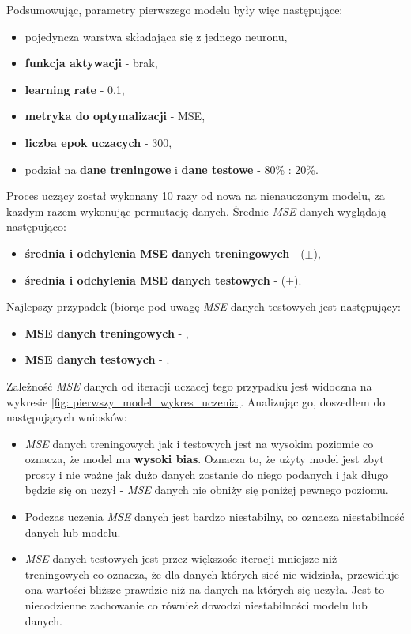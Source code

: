 \documentclass[12pt]{aghdpl}
\begin{document}
		Podsumowując, parametry pierwszego modelu były więc następujące:
		\begin{itemize}
		\item pojedyncza warstwa składająca się z jednego neuronu,
		\item \textbf{funkcja aktywacji} - brak,
		\item \textbf{learning rate} - 0.1,
		\item \textbf{metryka do optymalizacji} - MSE,
		\item \textbf{liczba epok uczacych} - 300,
		\item podział na \textbf{dane treningowe} i \textbf{dane testowe} - 80\% : 20\%.
		\end{itemize}
				
		Proces uczący został wykonany 10 razy od nowa na nienauczonym modelu, za kazdym razem wykonując permutację danych. Średnie \textit{MSE} danych wyglądają następująco:
		\begin{itemize}
		\item \textbf{średnia i odchylenia MSE danych treningowych} - ($\pm$),
		\item \textbf{średnia i odchylenia MSE danych testowych} - ($\pm$).
		\end{itemize}
		Najlepszy przypadek (biorąc pod uwagę \textit{MSE} danych testowych jest następujący:
		\begin{itemize}
		\item \textbf{MSE danych treningowych} - ,
		\item \textbf{MSE danych testowych} - .
		\end{itemize}
		Zależność \textit{MSE} danych od iteracji uczacej tego przypadku jest widoczna na wykresie \ref{fig: pierwszy_model_wykres_uczenia}. Analizując go, doszedłem do następujących wniosków:
		\begin{itemize}
		\item \textit{MSE} danych treningowych jak i testowych jest na wysokim poziomie co oznacza, że model ma \textbf{wysoki bias}. Oznacza to, że użyty model jest zbyt prosty i nie ważne jak dużo danych zostanie do niego podanych i jak długo będzie się on uczył - \textit{MSE} danych nie obniży się poniżej pewnego poziomu.
		\item Podczas uczenia \textit{MSE} danych jest bardzo niestabilny, co oznacza niestabilność danych lub modelu.
		\item \textit{MSE} danych testowych jest przez większośc iteracji mniejsze niż treningowych co oznacza, że dla danych których sieć nie widziała, przewiduje ona wartości bliższe prawdzie niż na danych na których się uczyła. Jest to niecodzienne zachowanie co również dowodzi niestabilności modelu lub danych.
		\end{itemize}
		
\end{document}

